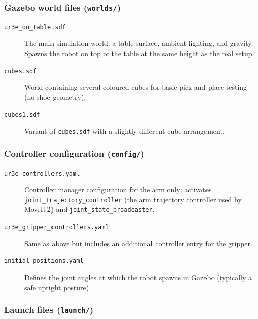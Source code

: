 \documentclass[11pt,a4paper]{article}
\newcommand{\file}[1]{\texttt{#1}}
\begin{document}
\subsubsection{Gazebo world files (\file{worlds/})}

\begin{description}
  \item[\file{ur3e\_on\_table.sdf}]
    The main simulation world: a table surface, ambient lighting, and gravity.
    Spawns the robot on top of the table at the same height as the real setup.

  \item[\file{cubes.sdf}]
    World containing several coloured cubes for basic pick-and-place testing
    (no shoe geometry).

  \item[\file{cubes1.sdf}]
    Variant of \file{cubes.sdf} with a slightly different cube arrangement.
\end{description}

\subsubsection{Controller configuration (\file{config/})}

\begin{description}
  \item[\file{ur3e\_controllers.yaml}]
    Controller manager configuration for the arm only: activates
    \texttt{joint\_trajectory\_controller} (the arm trajectory controller used
    by MoveIt\,2) and \texttt{joint\_state\_broadcaster}.

  \item[\file{ur3e\_gripper\_controllers.yaml}]
    Same as above but includes an additional controller entry for the gripper.

  \item[\file{initial\_positions.yaml}]
    Defines the joint angles at which the robot spawns in Gazebo
    (typically a safe upright posture).
\end{description}

\subsubsection{Launch files (\file{launch/})}
\end{document}
